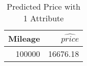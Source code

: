 \begin{table}[ht]
\centering
\begin{tabular}{rr}
  \hline
Mileage & $\widehat{price}$ \\ 
  \hline
100000 & 16676.18 \\ 
   \hline
\end{tabular}
\caption{Predicted Price with 1 Attribute} 
\label{tab:1p_predict}
\end{table}
